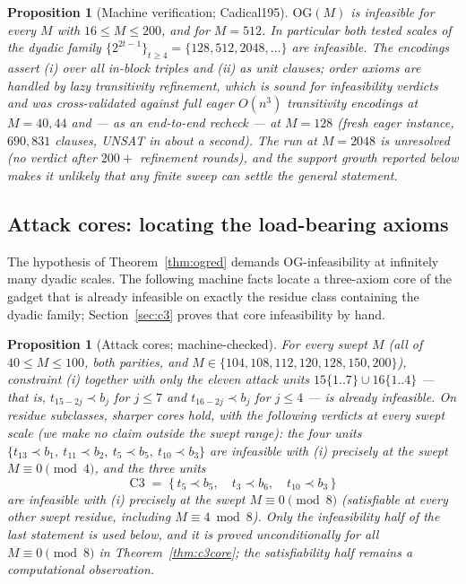 \documentclass[11pt]{article}
\newtheorem{proposition}[theorem]{Proposition}
\theoremstyle{definition}
\newcommand{\OG}{\mathrm{OG}}
\begin{document}
\begin{proposition}[Machine verification; Cadical195]\label{prop:ogmachine}
$\OG(M)$ is infeasible for every $M$ with $16 \le M \le 200$, and
for $M = 512$. In particular both tested scales of the dyadic family
$\{2^{2t-1}\}_{t \ge 4} = \{128, 512, 2048, \dots\}$ are infeasible.
The encodings assert (i) over all in-block triples and (ii) as unit
clauses; order axioms are handled by lazy transitivity refinement,
which is sound for infeasibility verdicts and was cross-validated
against full eager $O(n^3)$ transitivity encodings at $M = 40, 44$ and
--- as an end-to-end recheck --- at $M = 128$ (fresh eager instance,
$690{,}831$ clauses, UNSAT in about a second). The run at $M = 2048$
is unresolved (no verdict after $200+$ refinement rounds), and the
support growth reported below makes it unlikely that any finite sweep
can settle the general statement.
\end{proposition}

\subsection{Attack cores: locating the load-bearing axioms}

The hypothesis of Theorem~\ref{thm:ogred} demands $\OG$-infeasibility at
infinitely many dyadic scales. The following machine facts locate a
three-axiom core of the gadget that is already infeasible on exactly the
residue class containing the dyadic family; Section~\ref{sec:c3} proves
that core infeasibility by hand.

\begin{proposition}[Attack cores; machine-checked]\label{prop:cores}
For every swept $M$ (all of $40 \le M \le 100$, both parities, and
$M \in \{104, 108, 112, 120, 128, 150, 200\}$), constraint (i)
together with only the eleven attack units
$15\{1..7\} \cup 16\{1..4\}$ --- that is, $t_{15-2j} \prec b_j$ for
$j \le 7$ and $t_{16-2j} \prec b_j$ for $j \le 4$ --- is already
infeasible. On residue subclasses, sharper cores hold, with the following
verdicts \emph{at every swept scale} (we make no claim outside the swept
range): the four units $\{t_{13} \prec b_1,\ t_{11} \prec b_2,\
t_5 \prec b_5,\ t_{10} \prec b_3\}$ are infeasible with (i) precisely at the
swept $M \equiv 0 \pmod 4$, and the three units
\[
\mathrm{C3} \;=\; \{\,t_5 \prec b_5,\quad t_3 \prec b_6,\quad
t_{10} \prec b_3\,\}
\]
are infeasible with (i) precisely at the swept $M \equiv 0 \pmod 8$
(satisfiable at every other swept residue, including
$M \equiv 4 \bmod 8$). Only the infeasibility half of the last statement is
used below, and it is proved unconditionally for all
$M \equiv 0 \pmod 8$ in Theorem~\ref{thm:c3core}; the satisfiability half
remains a computational observation.
\end{proposition}
\end{document}
